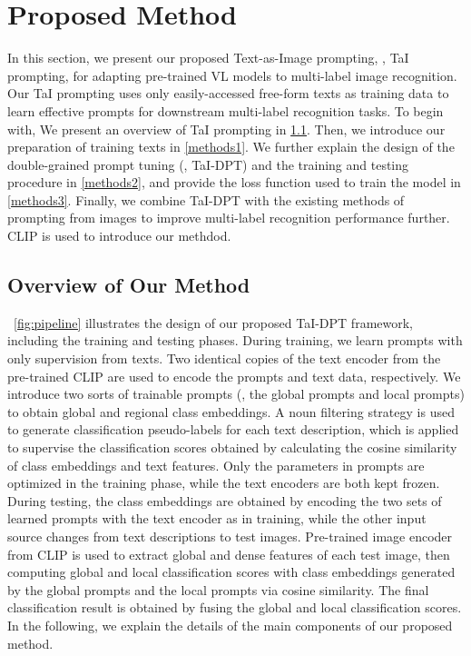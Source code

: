 \documentclass[10pt,twocolumn,letterpaper]{article}
\begin{document}
\section{Proposed Method}
\label{sec:method}
In this section, we present our proposed Text-as-Image prompting, \ie, TaI prompting, for adapting pre-trained VL models to multi-label image recognition. 
Our TaI prompting uses only easily-accessed free-form texts as training data to learn effective prompts for downstream multi-label recognition tasks. 
To begin with, We present an overview of TaI prompting in \cref{methods0}. 
Then, we introduce our preparation of training texts in \cref{methods1}. 
We further explain the design of the double-grained prompt tuning (\ie, TaI-DPT) and the training and testing procedure in \cref{methods2}, and provide the loss function used to train the model in \cref{methods3}.
Finally, we combine TaI-DPT with the existing methods of prompting from images to improve multi-label recognition performance further.
CLIP is used to introduce our methdod.

\subsection{Overview of Our Method}
\label{methods0}
~\cref{fig:pipeline} illustrates the design of our proposed TaI-DPT framework, including the training and testing phases. 
During training, we learn prompts with only supervision from texts. Two identical copies of the text encoder  from the pre-trained CLIP are used to encode the prompts and text data, respectively. 
We introduce two sorts of trainable prompts (\ie, the global prompts and local prompts) to obtain global and regional class embeddings.
A noun filtering strategy is used to generate classification pseudo-labels for each text description, which is applied to supervise the classification scores obtained by calculating the cosine similarity of class embeddings and text features. 
Only the parameters in prompts are optimized in the training phase, while the text encoders are both kept frozen.
During testing, the class embeddings are obtained by encoding the two sets of learned prompts with the text encoder  as in training, while the other input source changes from text descriptions to test images. 
Pre-trained image encoder  from CLIP is used to extract global and dense features of each test image, then computing global and local classification scores with class embeddings generated by the global prompts and the local prompts via cosine similarity. 
The final classification result is obtained by fusing the global and local classification scores.
In the following, we explain the details of the main components of our proposed method.
\end{document}
